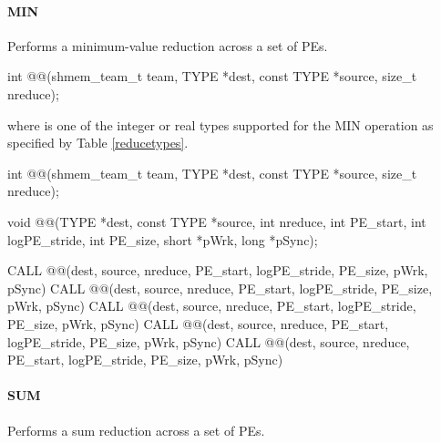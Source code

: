 \begin{apidefinition}
\paragraph{MIN}
Performs a minimum-value reduction across a set of \acp{PE}.\newline

{\color{Green}
\begin{C11synopsis}
int @@(shmem_team_t team, TYPE *dest, const TYPE *source, size_t nreduce);
\end{C11synopsis}
where \TYPE{} is one of the integer or real types supported for the MIN operation as specified by Table \ref{reducetypes}.
}

\begin{Csynopsis}
\end{Csynopsis}
{\color{Green}
\begin{CsynopsisCol}
int @@(shmem_team_t team, TYPE *dest, const TYPE *source, size_t nreduce);
\end{CsynopsisCol}
}
\begin{DeprecateBlock}
\begin{CsynopsisCol}
void @@(TYPE *dest, const TYPE *source, int nreduce, int PE_start, int logPE_stride, int PE_size, short *pWrk, long *pSync);
\end{CsynopsisCol}
\end{DeprecateBlock}

\begin{Fsynopsis}
CALL @@(dest, source, nreduce, PE_start, logPE_stride, PE_size, pWrk, pSync)
CALL @@(dest, source, nreduce, PE_start, logPE_stride, PE_size, pWrk, pSync)
CALL @@(dest, source, nreduce, PE_start, logPE_stride, PE_size, pWrk, pSync)
CALL @@(dest, source, nreduce, PE_start, logPE_stride, PE_size, pWrk, pSync)
CALL @@(dest, source, nreduce, PE_start, logPE_stride, PE_size, pWrk, pSync)
\end{Fsynopsis}

\paragraph{SUM}
Performs a sum reduction across a set of \acp{PE}.\newline


\end{apidefinition}
